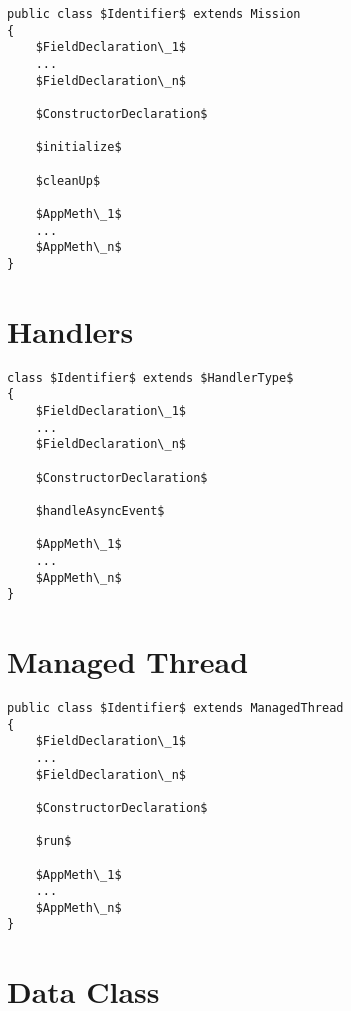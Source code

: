 \documentclass[11pt,a4paper]{article}
\begin{document}
\begin{lstlisting}
public class $Identifier$ extends Mission
{
	$FieldDeclaration\_1$
	...
	$FieldDeclaration\_n$

	$ConstructorDeclaration$

	$initialize$

	$cleanUp$

	$AppMeth\_1$
	...
	$AppMeth\_n$
}
\end{lstlisting}

\newpage

\section*{Handlers}

\begin{lstlisting}
class $Identifier$ extends $HandlerType$
{
	$FieldDeclaration\_1$
	...
	$FieldDeclaration\_n$

	$ConstructorDeclaration$

	$handleAsyncEvent$

	$AppMeth\_1$
	...
	$AppMeth\_n$
}
\end{lstlisting}

\newpage

\section*{Managed Thread}

\begin{lstlisting}
public class $Identifier$ extends ManagedThread
{
	$FieldDeclaration\_1$
	...
	$FieldDeclaration\_n$

	$ConstructorDeclaration$

	$run$

	$AppMeth\_1$
	...
	$AppMeth\_n$
}
\end{lstlisting}


\section*{Data Class}


\end{document}
